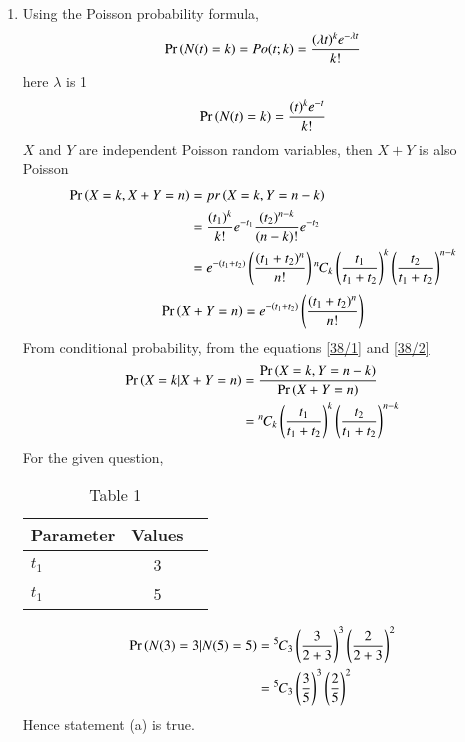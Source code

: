 \documentclass[journal,12pt,onecolumn]{IEEEtran}
\theoremstyle{remark}
\begin{document}
\begin{enumerate}[label=(\alph*)]
\item Using the Poisson probability formula,\\
 \begin{align}
 \Pr\left(N(t)=k\right) =Po(t;k) =\frac{(\lambda t)^k e^{-\lambda t}}{k!} 
  \end{align}
 here $\lambda$ is 1 
 \begin{align}
 \Pr\left(N(t)=k\right) = \frac{(t)^k e^{-t}}{k!}\\
 \end{align}
 $X$ and $Y$ are independent Poisson random variables, then $X+Y$ is also Poisson\\
 \begin{align}
 \Pr\left(X=k,X+Y=n\right)&=pr\left(X=k,Y=n-k\right)\\
 &=\frac{(t_1)^k}{k!}e^{-t_1}\frac{(t_2)^{n-k}}{(n-k)!}e^{-t_2}\\
 &=e^{-(t_1+t_2)}\left(\frac{(t_1+t_2)^n}{n!}\right){{}^{n}\mkern-1muC_{k}}\left(\frac{t_1}{t_1+t_2}\right)^k\left(\frac{t_2}{t_1+t_2}\right)^{n-k} \label{38/1}
 \end{align}
 \begin{align}
  \Pr\left(X+Y=n\right)=e^{-(t_1+t_2)}\left(\frac{(t_1+t_2)^n}{n!}\right)\label{38/2}
 \end{align}
  From conditional probability,
  from the equations \eqref{38/1} and \eqref{38/2}
 \begin{align}
 \Pr\left(X=k|X+Y=n\right)&=\frac{\Pr\left(X=k,Y=n-k\right)}{\Pr\left(X+Y=n\right)}\\
 &={{}^{n}\mkern-1muC_{k}}\left(\frac{t_1}{t_1+t_2}\right)^k\left(\frac{t_2}{t_1+t_2}\right)^{n-k}
 \end{align} 
 For the given question,
 \begin{table}[h!]
 \begin{center}
    \begin{tabular}{|l|c|r|}
    \hline
    Parameter & Values \\
    \hline
    $t_1$ &  3\\
    $t_1$&  5 \\
    \hline
    \end{tabular}
    \end{center}
    \caption{Table 1}
\end{table}
 \begin{align}
 \Pr\left(N(3)=3|N(5)=5\right)&={{}^{5}\mkern-1muC_{3}}\left(\frac{3}{2+3}\right)^3\left(\frac{2}{2+3}\right)^{2}\\
 &={{}^{5}\mkern-1muC_{3}}\left(\frac{3}{5}\right)^3\left(\frac{2}{5}\right)^{2}
 \end{align}
 Hence statement (a) is true.
 

\end{enumerate}
\end{document}
